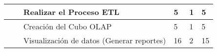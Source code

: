 \begin{longtable}{|p{1cm}|p{4cm}|p{5cm}|p{2cm}|p{2cm}|p{2cm}|}
                                                                 &                                                    & Realizar el Proceso ETL                                                           & 5                                               & 1                                   & 5                                    \\ \hline
                                                                 &                                                    & Creación del Cubo OLAP                                                            & 5                                               & 1                                   & 5                                    \\ \hline
                                                                 &                                                    & Visualización de datos (Generar reportes)                                         & 16                                              & 2                                   & 15                                   \\ \hline
\end{longtable}